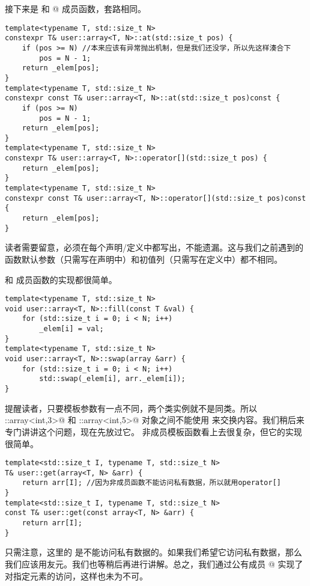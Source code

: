 接下来是 \lstinline@at@ 和 \lstinline@operator[]@ 成员函数，套路相同。
\begin{lstlisting}
template<typename T, std::size_t N>
constexpr T& user::array<T, N>::at(std::size_t pos) {
    if (pos >= N) //本来应该有异常抛出机制，但是我们还没学，所以先这样湊合下
        pos = N - 1;
    return _elem[pos];
}
template<typename T, std::size_t N>
constexpr const T& user::array<T, N>::at(std::size_t pos)const {
    if (pos >= N)
        pos = N - 1;
    return _elem[pos];
}
template<typename T, std::size_t N>
constexpr T& user::array<T, N>::operator[](std::size_t pos) {
    return _elem[pos];
}
template<typename T, std::size_t N>
constexpr const T& user::array<T, N>::operator[](std::size_t pos)const {
    return _elem[pos];
}
\end{lstlisting}
读者需要留意，\lstinline@constexpr@ 必须在每个声明/定义中都写出，不能遗漏。这与我们之前遇到的函数默认参数（只需写在声明中）和初值列（只需写在定义中）都不相同。\par
\lstinline@fill@ 和 \lstinline@swap@ 成员函数的实现都很简单。
\begin{lstlisting}
template<typename T, std::size_t N>
void user::array<T, N>::fill(const T &val) {
    for (std::size_t i = 0; i < N; i++)
        _elem[i] = val;
}
template<typename T, std::size_t N>
void user::array<T, N>::swap(array &arr) {
    for (std::size_t i = 0; i < N; i++)
        std::swap(_elem[i], arr._elem[i]);
}
\end{lstlisting}
提醒读者，只要模板参数有一点不同，两个类实例就不是同类。所以 \lstinline@user::array<int,3>@ 和 \lstinline@user::array<int,5>@ 对象之间不能使用 \lstinline@swap@ 来交换内容。我们稍后来专门讲讲这个问题，现在先放过它。
\lstinline@get@ 非成员模板函数看上去很复杂，但它的实现很简单。
\begin{lstlisting}
template<std::size_t I, typename T, std::size_t N>
T& user::get(array<T, N> &arr) {
    return arr[I]; //因为非成员函数不能访问私有数据，所以就用operator[]
}
template<std::size_t I, typename T, std::size_t N>
const T& user::get(const array<T, N> &arr) {
    return arr[I];
}
\end{lstlisting}
只需注意，这里的 \lstinline@get@ 是不能访问私有数据的。如果我们希望它访问私有数据，那么我们应该用友元。我们也等稍后再进行讲解。总之，我们通过公有成员 \lstinline@operator[]@ 实现了对指定元素的访问，这样也未为不可。\par
